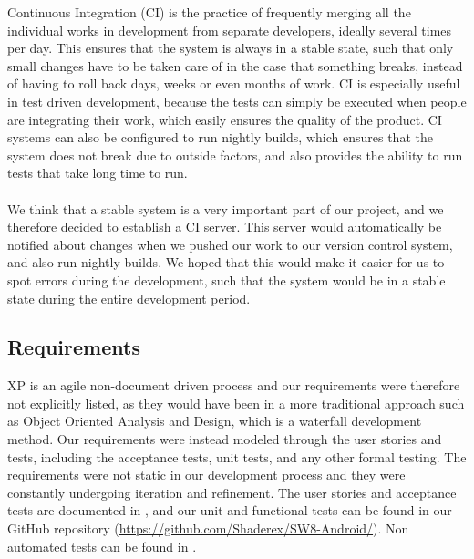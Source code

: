 Continuous Integration (CI) is the practice of frequently merging all the individual works in development from separate developers, ideally several times per day. This ensures that the system is always in a stable state, such that only small changes have to be taken care of in the case that something breaks, instead of having to roll back days, weeks or even months of work. CI is especially useful in test driven development, because the tests can simply be executed when people are integrating their work, which easily ensures the quality of the product. CI systems can also be configured to run nightly builds, which ensures that the system does not break due to outside factors, and also provides the ability to run tests that take long time to run.
\\\\
We think that a stable system is a very important part of our project, and we therefore decided to establish a CI server. This server would automatically be notified about changes when we pushed our work to our version control system, and also run nightly builds. We hoped that this would make it easier for us to spot errors during the development, such that the system would be in a stable state during the entire development period. 

\subsection{Requirements}

XP is an agile non-document driven process and our requirements were therefore not explicitly listed, as they would have been in a more traditional approach such as Object Oriented Analysis and Design, which is a waterfall development method. Our requirements were instead modeled through the user stories and tests, including the acceptance tests, unit tests, and any other formal testing. The requirements were not static in our development process and they were constantly undergoing iteration and refinement. The user stories and acceptance tests are documented in , and our unit and functional tests can be found in our GitHub repository (\href{https://github.com/Shaderex/SW8-Android/}{https://github.com/Shaderex/SW8-Android/}). Non automated tests can be found in .

